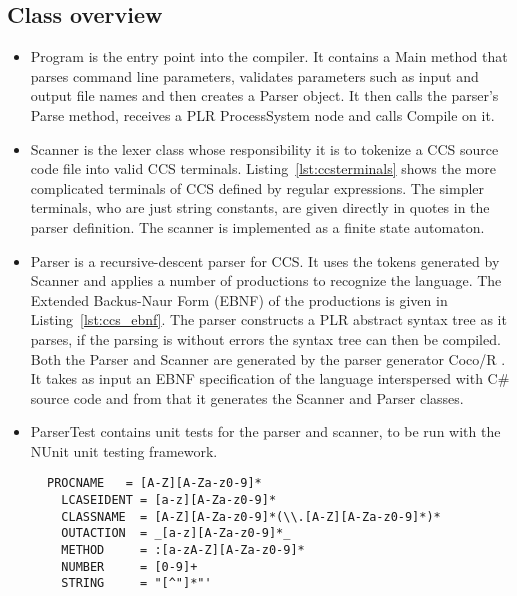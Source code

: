\subsection{Class overview}\label{ccs_class_overview}
	\begin{itemize}
	
	\item \textsf{Program} is the entry point into the compiler. It contains a 
	\textsf{Main} method that parses command line parameters, validates 
	parameters such as input and output file names and then creates a 
	\textsf{Parser} object. It then calls the parser's \textsf{Parse} method, 
	receives a PLR \textsf{ProcessSystem} node and calls \textsf{Compile} on it. 
	
	\item \textsf{Scanner} is the lexer class whose responsibility it is to 
	tokenize a CCS source code file into valid CCS terminals. 
	Listing~\ref{lst:ccsterminals} shows the more complicated terminals of CCS 
	defined by regular expressions. The simpler terminals, who are just string 
	constants, are given directly in quotes in the parser definition. The 
	scanner is implemented as a finite state automaton.
	
  \item \textsf{Parser} is a recursive-descent parser for CCS. It uses the 
  tokens generated by \textsf{Scanner} and applies a number of 
  \textsf{productions} to recognize the language. The Extended Backus-Naur 
  Form (EBNF) of the productions is given in Listing~\ref{lst:ccs_ebnf}. The 
  parser constructs a PLR abstract syntax tree as it parses, if the parsing is 
  without errors the syntax tree can then be compiled. Both the 
  \textsf{Parser} and \textsf{Scanner} are generated by the parser generator 
  Coco/R \cite{cocor}. It takes as input an EBNF specification of the language 
  interspersed with C\# source code and from that it generates the 
  \textsf{Scanner} and \textsf{Parser} classes. 
	
	\item \textsf{ParserTest} contains unit tests for the parser and scanner, to 
	be run with the NUnit unit testing framework.
	
	\end{itemize}
	\begin{figure}
\lstset{showtabs=false,showspaces=false,showstringspaces=false}
\begin{lstlisting}[caption=Terminals of CCS scanner,label=lst:ccsterminals,frame=trbl,basicstyle=\scriptsize\ttfamily,showtabs=false,showspaces=false]
  PROCNAME   = [A-Z][A-Za-z0-9]*
  LCASEIDENT = [a-z][A-Za-z0-9]*
  CLASSNAME  = [A-Z][A-Za-z0-9]*(\\.[A-Z][A-Za-z0-9]*)*
  OUTACTION  = _[a-z][A-Za-z0-9]*_
  METHOD     = :[a-zA-Z][A-Za-z0-9]*
  NUMBER     = [0-9]+
  STRING     = "[^"]*"'
  \end{lstlisting}
	\end{figure}
	

